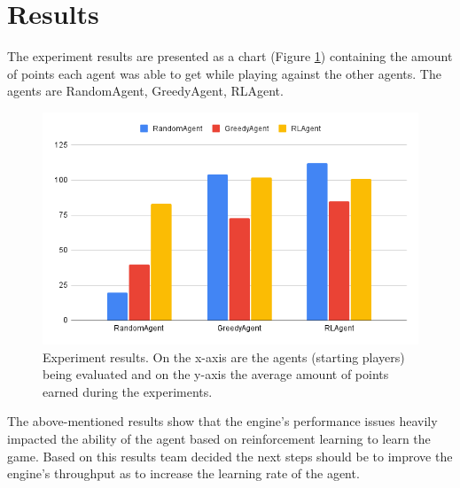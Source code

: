 \section{Results}

The experiment results are presented as a chart (Figure \ref{fig:Results}) containing the amount of 
points each agent was able to get while playing against the other agents. The agents are
RandomAgent, GreedyAgent, RLAgent.

\begin{figure}[h]
	\includegraphics[width=\linewidth]{figures/chart}
	\caption{Experiment results. On the x-axis are the agents (starting players) being evaluated and on the y-axis the average amount of points earned during the experiments.}
	\label{fig:Results}
\end{figure}

The above-mentioned results show that the engine's performance issues heavily
impacted the ability of the agent based on reinforcement learning to learn the game.
Based on this results team decided the next steps should be to improve the engine's
throughput as to increase the learning rate of the agent.
